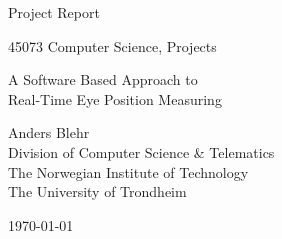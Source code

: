 \begin{titlepage}
\begin{center}

\vspace*{1in}

{\large Project Report}

\vspace*{0.1in}

{\Large 45073 Computer Science, Projects}

\vspace*{0.8in}
\vspace*{0.8in}

{\Huge A Software Based Approach to\\}
\vspace*{0.05in}
{\Huge Real-Time Eye Position Measuring}

\vspace*{0.8in}

{\large Anders Blehr\\
Division of Computer Science \& Telematics\\
The Norwegian Institute of Technology\\
The University of Trondheim}

\vspace*{0.8in}
\today
\vspace*{.5in}
\end{center}
\end{titlepage}
